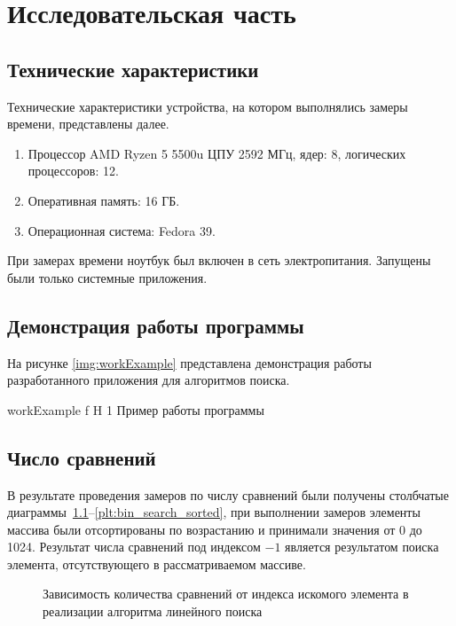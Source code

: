 \chapter{Исследовательская часть}
\section{Технические характеристики}

Технические характеристики устройства, на котором выполнялись замеры времени, представлены далее.

\begin{enumerate}
	\item Процессор	AMD Ryzen 5 5500u ЦПУ 2592 МГц, ядер: 8, логических процессоров: 12.
	\item Оперативная память: 16 ГБ.
	\item Операционная система: Fedora 39.
\end{enumerate}

При замерах времени ноутбук был включен в сеть электропитания. Запущены были только системные приложения.

\section{Демонстрация работы программы}

На рисунке \ref{img:workExample} представлена демонстрация работы разработанного приложения для алгоритмов поиска.

{workExample}
{f}
{H}
{1\textwidth}
{Пример работы программы}

\section{Число сравнений}

В результате проведения замеров по числу сравнений были получены столбчатые диаграммы~\ref{plt:dummy_search}--\ref{plt:bin_search_sorted}, при выполнении замеров элементы массива были отсортированы по возрастанию и принимали значения от 0 до 1024. Результат числа сравнений под индексом $-1$ является результатом поиска элемента, отсутствующего в рассматриваемом массиве.

\begin{figure}[H]
	\centering
	
	\caption{Зависимость количества сравнений от индекса искомого элемента в реализации алгоритма линейного поиска}
	\label{plt:dummy_search}
\end{figure}

